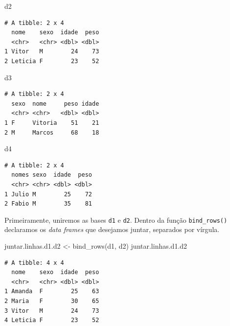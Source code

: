 \documentclass[
  brazilian,
]{book}
\newenvironment{Shaded}{\begin{snugshade}}{\end{snugshade}}
\newcommand{\FunctionTok}[1]{\textcolor[rgb]{0.00,0.00,0.00}{#1}}
\newcommand{\NormalTok}[1]{#1}
\newcommand{\OtherTok}[1]{\textcolor[rgb]{0.56,0.35,0.01}{#1}}
\begin{document}
\begin{Shaded}
\begin{Highlighting}[]
\NormalTok{d2}
\end{Highlighting}
\end{Shaded}

\begin{verbatim}
# A tibble: 2 x 4
  nome    sexo  idade  peso
  <chr>   <chr> <dbl> <dbl>
1 Vitor   M        24    73
2 Leticia F        23    52
\end{verbatim}

\begin{Shaded}
\begin{Highlighting}[]
\NormalTok{d3}
\end{Highlighting}
\end{Shaded}

\begin{verbatim}
# A tibble: 2 x 4
  sexo  nome     peso idade
  <chr> <chr>   <dbl> <dbl>
1 F     Vitoria    51    21
2 M     Marcos     68    18
\end{verbatim}

\begin{Shaded}
\begin{Highlighting}[]
\NormalTok{d4}
\end{Highlighting}
\end{Shaded}

\begin{verbatim}
# A tibble: 2 x 4
  nomes sexo  idade  peso
  <chr> <chr> <dbl> <dbl>
1 Julio M        25    72
2 Fabio M        35    81
\end{verbatim}

Primeiramente, uniremos as bases \texttt{d1} e \texttt{d2}. Dentro da função \texttt{bind\_rows()} declaramos os \emph{data frames} que desejamos juntar, separados por vírgula.

\begin{Shaded}
\begin{Highlighting}[]
\NormalTok{juntar.linhas.d1.d2 }\OtherTok{\textless{}{-}} \FunctionTok{bind\_rows}\NormalTok{(d1, d2)}
\NormalTok{juntar.linhas.d1.d2}
\end{Highlighting}
\end{Shaded}

\begin{verbatim}
# A tibble: 4 x 4
  nome    sexo  idade  peso
  <chr>   <chr> <dbl> <dbl>
1 Amanda  F        25    63
2 Maria   F        30    65
3 Vitor   M        24    73
4 Leticia F        23    52
\end{verbatim}
\end{document}
